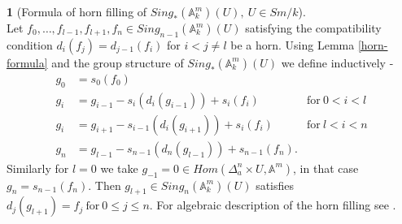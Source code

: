 \documentclass[11pt, reqno]{amsart}
\theoremstyle{plain}
\theoremstyle{definition}
\newtheorem{point}[thm]{}
\newcommand{\A}{{\mathbb A}}
\begin{document}
\begin{point}[Formula of horn filling of $Sing_*(\mathbb{A}^m_k)(U),\ U\in Sm/k$]\label{full hornfill An}~\\
	Let $f_0,\dots,f_{l-1},f_{l+1},f_n \in Sing_{n-1}(\A^m_k)(U)$ satisfying the compatibility condition $d_i(f_j)=d_{j-1}(f_i)$ for $i<j\neq l$ be a horn. Using Lemma \ref{horn-formula} and the group structure of $Sing_*(\A^m_k)(U)$ we define inductively -
	\begin{align*}
		g_0 &= s_0(f_0)& \\
		g_i &= g_{i-1}- s_i(d_i(g_{i-1})) + s_i(f_i)\  &\mathrm{ for}\ 0<i<l\\
		g_i &= g_{i+1} - s_{i-1}(d_i(g_{i+1})) + s_i(f_i)\  & \mathrm{for}\ l<i<n\\
		g_n &= g_{l-1} - s_{n-1}(d_n(g_{l-1})) + s_{n-1}(f_n).&
	\end{align*}
Similarly for $l=0$ we take $g_{-1}=0\in Hom(\Delta^n_a \times U,\A^m)$, in that case $g_n=s_{n-1}(f_n)$. Then $g_{l+1}\in Sing_n(\A^m_k)(U)$ satisfies $d_j(g_{l+1})=f_j \mathrm{\ for\ } 0\leq j\leq n$. For algebraic description of the horn filling see \cite[7.1.1]{Biman-Thesis}.
	
	
\end{point}
\end{document}
